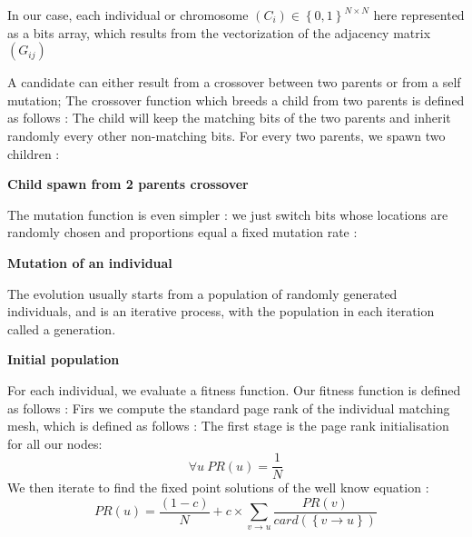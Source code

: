 \documentclass{iSWAGArticle}
\begin{document}
In our case, each individual or chromosome $\left(C_{i}\right)  \in \left\{0,1\right\}^{N\times N}$ here represented as a bits array, which results from the vectorization of
the adjacency matrix $\left(G_{ij}\right)$


A candidate can either result from a crossover between two parents or from a self mutation;
The crossover function which breeds a child from two parents is defined as follows :
The child will keep the matching bits of the two parents and inherit randomly every other non-matching bits.
For every two parents, we spawn two children :
\\\newline
\begin{center}
\textbf{\large Child spawn from 2 parents crossover}
\end{center}
The mutation function is even simpler : we just switch bits whose locations are randomly chosen
and proportions equal a fixed mutation rate : 
\\\newline
\begin{center}
\textbf{\large Mutation of an individual}
\end{center}

The evolution usually starts from a population of randomly generated individuals, 
and is an iterative process, with the population in each iteration called a generation.
\\\newline
\begin{center}
\textbf{\large Initial population}
\end{center}

For each individual, we evaluate a fitness function. Our fitness function is defined as follows :
Firs we compute the standard page rank of the individual matching mesh, which is defined as follows :
The first stage is the page rank initialisation for all our nodes:
\begin{equation}
\forall u \ PR\left(u\right)=\frac{1}{N}
\end{equation} 
We then iterate to find the fixed point solutions of the well know equation :
\begin{equation}
PR\left(u\right)= \frac{\left(1-c\right)}{N} + c \times \sum_{v \rightarrow u}\frac{PR\left(v\right)}{card\left(\left\{v\rightarrow u\right\}\right)}
\end{equation}
\end{document}
